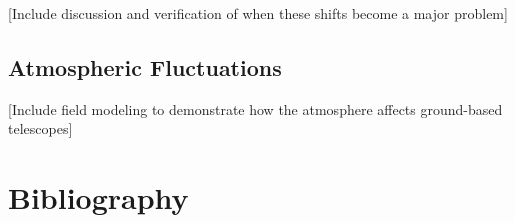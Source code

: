 \documentclass[%
 reprint,
 amsmath,amssymb,
 aps,
 pra,
]{revtex4-1}
\begin{document}
{[Include discussion and verification of when these shifts become a major problem]

\subsection{Atmospheric Fluctuations}\label{subsec:atmosphere-model}

[Include field modeling to demonstrate how the atmosphere affects ground-based telescopes]

\section{Bibliography}\label{sec:references}

}
\end{document}
